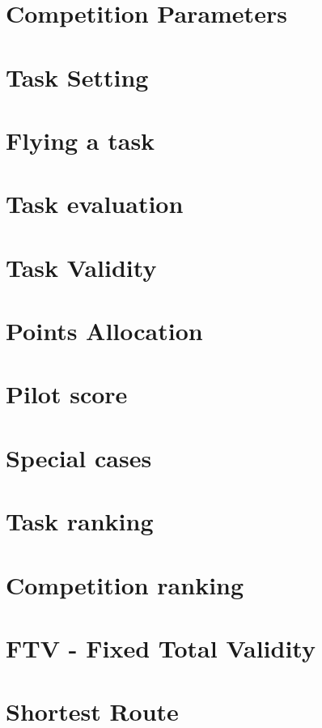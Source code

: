 \documentclass{article}
\begin{document}
\newpage
\section{Competition Parameters}


\newpage
\section{Task Setting}


\newpage
\section{Flying a task}


\newpage
\section{Task evaluation}


\newpage
\section{Task Validity}


\newpage
\section{Points Allocation}


\newpage
\section{Pilot score}


\newpage
\section{Special cases}


\newpage
\section{Task ranking}


\newpage
\section{Competition ranking}


\newpage
\section{FTV - Fixed Total Validity}


\newpage
\appendix
\section{Shortest Route}

\end{document}
